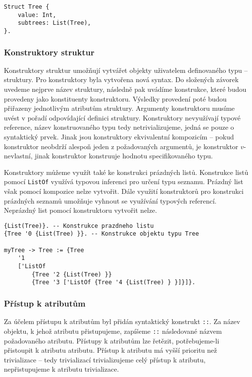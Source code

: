 \begin{lstlisting}[caption={Příklad definice struktury}]
Struct Tree {
    value: Int,
    subtrees: List(Tree),
}.
\end{lstlisting}

\subsubsection{Konstruktory struktur}

Konstruktory struktur umožňují vytvářet objekty uživatelem definovaného typu -- struktury.
Pro konstruktory byla vytvořena nová syntax. Do složených závorek uvedeme nejprve název struktury,
následně pak uvádíme konstrukce, které budou provedeny jako konstituenty konstruktoru. Výsledky
provedení poté budou přiřazeny jednotlivým atributům struktury. Argumenty konstruktoru musíme uvést
v pořadí odpovídající definici struktury. Konstruktory nevyužívají typové reference, název
konstruovaného typu tedy netrivializujeme, jedná se pouze o syntaktický prvek. Jinak jsou
konstruktory ekvivalentní kompozicím -- pokud konstruktor neobdrží alespoň jeden z požadovaných
argumentů, je konstruktor $v$-nevlastní, jinak konstruktor konstruuje hodnotu specifikovaného typu.

Konstruktory můžeme využít také ke konstrukci prázdných listů. Konstrukce listů pomocí
\lstinline{ListOf} využívá typovou inferenci pro určení typu seznamu. Prázdný list však pomocí
kompozice nelze vytvořit. Dále využití konstruktorů pro konstrukci prázdných seznamů umožňuje
vyhnout se využívání typových referencí. Neprázdný list pomocí konstruktoru vytvořit nelze.

\begin{lstlisting}[caption={Příklad definice struktury}]
{List(Tree)}. -- Konstrukce prazdneho listu
{Tree '0 {List(Tree) }}. -- Konstrukce objektu typu Tree

myTree -> Tree := {Tree
    '1
    ['ListOf 
        {Tree '2 {List(Tree) }}
        {Tree '3 ['ListOf {Tree '4 {List(Tree) } }]}]}.
\end{lstlisting}

\subsubsection{Přístup k atributům}

Za účelem přístupu k atributům byl přidán syntaktický konstrukt \lstinline{::}. Za název objektu,
k jehož atributu přistupujeme, zapíšeme \lstinline{::} následované názvem požadovaného atributu.
Přístupy k atributům lze řetězit, potřebujeme-li přistoupit k atributu atributu. Přístup k atributu
má vyšší prioritu než trivializace -- tedy trivializací trivializujeme celý přístup k atributu,
nepřistupujeme k atributu trivializace.

